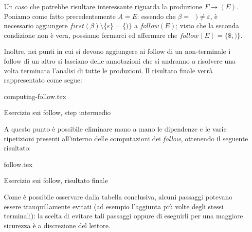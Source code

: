 \documentclass[class=book, crop=false, oneside, 12pt]{standalone}
\begin{document}
Un caso che potrebbe risultare interessante riguarda la produzione \(F \rightarrow (E)\). Poniamo come fatto precedentemente \(A = E\): essendo che \(\beta = \textrm{ } ) \neq \varepsilon\), è necessario aggiungere \(first(\beta) \setminus \{\varepsilon\} = \{)\}\) a \(follow(E)\); visto che la seconda condizione non è vera, possiamo fermarci ed affermare che \(follow(E) = \{\$, )\}\).

Inoltre, nei punti in cui si devono aggiungere ai follow di un non-terminale i follow di un altro si lasciano delle annotazioni che si andranno a risolvere una volta terminata l'analisi di tutte le produzioni. Il risultato finale verrà rappresentato come segue:
\begin{table}[H]
	\centering
	{computing-follow.tex}
    \caption{Esercizio sui follow, step intermedio}
    \label{computing-follow}
\end{table}
A questo punto è possibile eliminare mano a mano le dipendenze e le varie ripetizioni presenti all'interno delle computazioni dei \emph{follow}, ottenendo il seguente risultato: 
\begin{table}[H]
	\centering
	{follow.tex}
    \caption{Esercizio sui follow, risultato finale}
    \label{follow}
\end{table}
Come è possibile osservare dalla tabella conclusiva, alcuni passaggi potevano essere tranquillamente evitati (ad esempio l'aggiunta più volte degli stessi terminali): la scelta di evitare tali passaggi oppure di eseguirli per una maggiore sicurezza è a discrezione del lettore.
\end{document}
